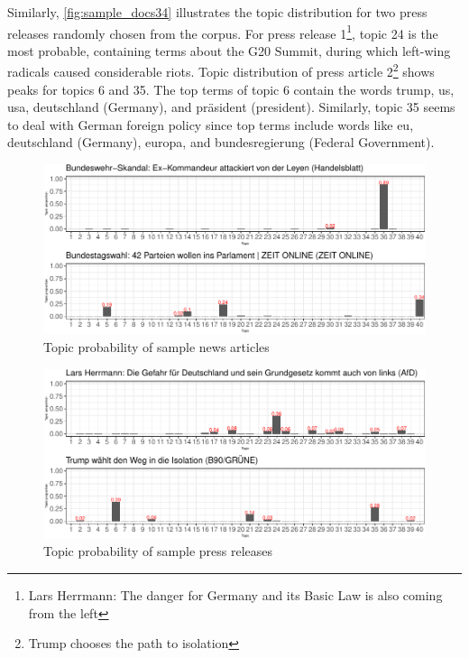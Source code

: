 \documentclass[
]{article}
\begin{document}
Similarly, \autoref{fig:sample_docs34} illustrates the topic
distribution for two press releases randomly chosen from the corpus. For
press release 1\footnote{Lars Herrmann: The danger for Germany and its
  Basic Law is also coming from the left}, topic 24 is the most
probable, containing terms about the G20 Summit, during which left-wing
radicals caused considerable riots. Topic distribution of press article
2\footnote{Trump chooses the path to isolation} shows peaks for topics 6
and 35. The top terms of topic 6 contain the words trump, us, usa,
deutschland (Germany), and präsident (president). Similarly, topic 35
seems to deal with German foreign policy since top terms include words
like eu, deutschland (Germany), europa, and bundesregierung (Federal
Government).

\begin{figure}

{\centering \includegraphics[width=0.8\linewidth]{main_text_files/figure-latex/News articles sample documents-1} 

}

\caption{Topic probability of sample news articles \label{fig:sample_docs12}}\label{fig:News articles sample documents}
\end{figure}

\begin{figure}

{\centering \includegraphics[width=0.8\linewidth]{main_text_files/figure-latex/Press releases sample documents-1} 

}

\caption{Topic probability of sample press releases \label{fig:sample_docs34}}\label{fig:Press releases sample documents}
\end{figure}
\end{document}
